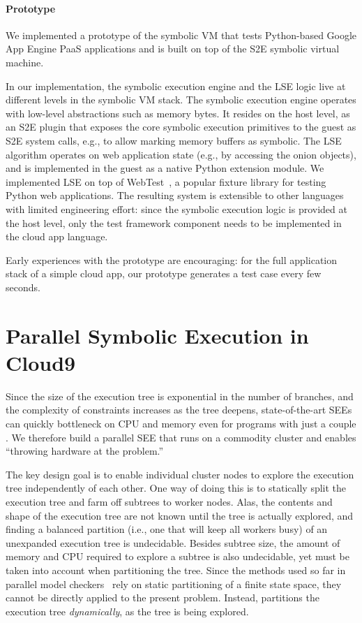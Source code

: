 \paragraph{Prototype}

We implemented a prototype of the symbolic VM that tests Python-based Google App Engine PaaS applications and is built on top of the S2E symbolic virtual machine.

In our implementation, the symbolic execution engine and the LSE logic live at different levels in the symbolic VM stack.
%
The symbolic execution engine operates with low-level abstractions such as memory bytes. It resides on the host level, as an S2E plugin that exposes the core symbolic execution primitives to the guest as S2E system calls, e.g., to allow marking memory buffers as symbolic.
%
The LSE algorithm operates on web application state (e.g., by accessing the onion objects), and is implemented in the guest as a native Python extension module.  We implemented LSE on top of WebTest~\cite{py-webtest}, a popular fixture library for testing Python web applications.
%
The resulting system is extensible to other languages with limited engineering effort: since the symbolic execution logic is provided at the host level, only the test framework component needs to be implemented in the cloud app language.

Early experiences with the prototype are encouraging: for the full application stack of a simple cloud app, our prototype generates a test case every few seconds.


\section{Parallel Symbolic Execution in Cloud9}
\label{sec:paas:parsymbex}

Since the size of the execution tree is exponential in the number of branches, and the complexity of constraints increases as the tree deepens, state-of-the-art SEEs can quickly bottleneck on CPU and memory even for programs with just a couple \kloc.  We therefore build a parallel SEE that runs on a commodity cluster and enables ``throwing hardware at the problem.''

The key design goal is to enable individual cluster nodes to explore the execution tree independently of each other.  One way of doing this is to statically split the execution tree and farm off subtrees to worker nodes.  Alas, the contents and shape of the execution tree are not known until the tree is actually explored, and finding a balanced partition (i.e., one that will keep all workers busy) of an unexpanded execution tree is undecidable.  Besides subtree size, the amount of  memory and CPU required to explore a subtree is also undecidable, yet must be taken into account when partitioning the tree. Since the methods used so far in parallel model checkers~\cite{swarm,spin:multicore-modelchecking} rely on static partitioning of a finite state space, they cannot be directly applied to the present problem. Instead, \cnine partitions the execution tree {\em dynamically}, as the tree is being explored. 

